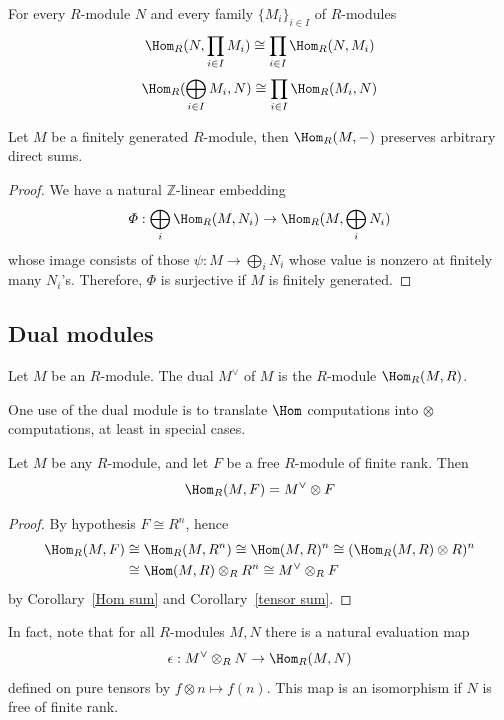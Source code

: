 \begin{corollary}\label{Hom sum}
For every $R$-module $N$ and every family $\{M_i\}_{i\in I}$ of $R$-modules
\[\Hom_R(N,\prod_{i\in I}M_i)\cong\prod_{i\in I}\Hom_R(N,M_i)\]
\[\Hom_R(\bigoplus_{i\in I}M_i,N)\cong\prod_{i\in I}\Hom_R(M_i,N)\]
\end{corollary}
\begin{proposition}
Let $M$ be a finitely generated $R$-module, then $\Hom_R(M,-)$ preserves arbitrary direct sums.
\end{proposition}
\begin{proof}
We have a natural $\mathbb Z$-linear embedding
\[\varPhi:\bigoplus_i\Hom_R(M,N_i)\to\Hom_R(M,\bigoplus_iN_i)\]
whose image consists of those $\psi:M\to\bigoplus_iN_i$ whose value is nonzero at finitely many $N_i$'s. Therefore, $\varPhi$ is surjective if $M$ is finitely generated. 
\end{proof}
\subsection{Dual modules}
\begin{definition}
Let $M$ be an $R$-module. The dual $M^{\vee}$ of $M$ is the $R$-module $\Hom_R(M,R)$.
\end{definition}
One use of the dual module is to translate $\Hom$ computations into $\otimes$ computations, at least in special cases.
\begin{proposition}
Let $M$ be any $R$-module, and let $F$ be a free $R$-module of finite rank. Then
\[\Hom_R(M,F)=M^{\vee}\otimes F\]
\end{proposition}
\begin{proof}
By hypothesis $F\cong R^n$, hence 
\begin{align*}
\Hom_R(M,F)&\cong\Hom_R(M,R^n)\cong\Hom(M,R)^n\cong(\Hom_R(M,R)\otimes R)^n\\
&\cong\Hom(M,R)\otimes_{R}R^n\cong M^{\vee}\otimes_{R} F
\end{align*}
by Corollary~\ref{Hom sum} and Corollary~\ref{tensor sum}.
\end{proof}
In fact, note that for all $R$-modules $M,N$ there is a natural evaluation map
\[\epsilon:M^{\vee}\otimes_{R}N\to\Hom_R(M,N)\]
defined on pure tensors by $f\otimes n\mapsto f(n)$. This map is an isomorphism if $N$ is free of finite rank.
